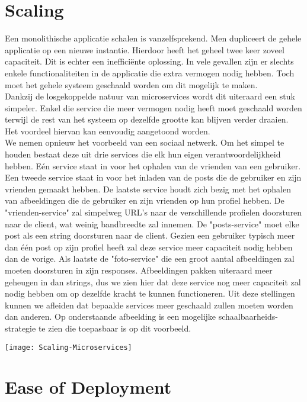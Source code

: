 \section{Scaling}
\label{sec:scaling}

Een monolithische applicatie schalen is vanzelfsprekend. Men dupliceert de gehele applicatie op een nieuwe instantie. Hierdoor heeft het geheel twee keer zoveel capaciteit. Dit is echter een inefficiënte oplossing. In vele gevallen zijn er slechts enkele functionaliteiten in de applicatie die extra vermogen nodig hebben. Toch moet het gehele systeem geschaald worden om dit mogelijk te maken.
\\
Dankzij de losgekoppelde natuur van microservices wordt dit uiteraard een stuk simpeler. Enkel die service die meer vermogen nodig heeft moet geschaald worden terwijl de rest van het systeem op dezelfde grootte kan blijven verder draaien. Het voordeel hiervan kan eenvoudig aangetoond worden. 
\\
We nemen opnieuw het voorbeeld van een sociaal netwerk. Om het simpel te houden bestaat deze uit drie services die elk hun eigen verantwoordelijkheid hebben. Eén service staat in voor het ophalen van de vrienden van een gebruiker. Een tweede service staat in voor het inladen van de posts die de gebruiker en zijn vrienden gemaakt hebben. De laatste service houdt zich bezig met het ophalen van afbeeldingen die de gebruiker en zijn vrienden op hun profiel hebben. De "vrienden-service" zal simpelweg URL's naar de verschillende profielen doorsturen naar de client, wat weinig bandbreedte zal innemen. De "posts-service" moet elke post als een string doorsturen naar de client. Gezien een gebruiker typisch meer dan één post op zijn profiel heeft zal deze service meer capaciteit nodig hebben dan de vorige. Als laatste de "foto-service" die een groot aantal afbeeldingen zal moeten doorsturen in zijn responses. Afbeeldingen pakken uiteraard meer geheugen in dan strings, dus we zien hier dat deze service nog meer capaciteit zal nodig hebben om op dezelfde kracht te kunnen functioneren. Uit deze stellingen kunnen we afleiden dat bepaalde services meer geschaald zullen moeten worden dan anderen. Op onderstaande afbeelding is een mogelijke schaalbaarheids-strategie te zien die toepasbaar is op dit voorbeeld.
\\
\begin{center}
\texttt{[image: Scaling-Microservices]}
\end{center}

\section{Ease of Deployment}
\label{sec:ease-of-deployment}

